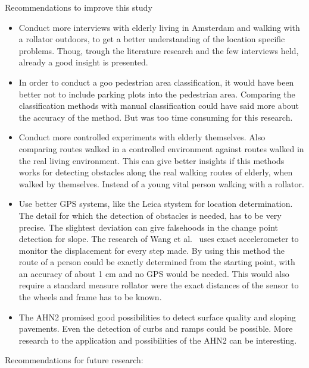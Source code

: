 Recommendations to improve this study
\begin{itemize}

\item Conduct more interviews with elderly living in Amsterdam and walking with a rollator outdoors, to get a better understanding of the location specific problems. Thoug, trough the literature research and the few interviews held, already a good insight is presented. 

\item In order to conduct a goo pedestrian area classification, it would have been better not to include parking plots into the pedestrian area. Comparing the classification methods with manual classification could have said more about the accuracy of the method. But was too time consuming for this research. 

\item Conduct more controlled experiments with elderly themselves. Also comparing routes walked in a controlled environment against routes walked in the real living environment. This can give better insights if this methods works for detecting obstacles along the real walking routes of elderly, when walked by themselves. Instead of a young vital person walking with a rollator. 

\item Use better GPS systems, like the Leica stystem for location determination. The detail for which the detection of obstacles is needed, has to be very precise. The slightest deviation can give falsehoods in the change point detection for slope. The research of Wang et al.~\cite{Wang2015} uses exact accelerometer to monitor the displacement for every step made. By using this method the route of a person could be exactly determined from the starting point, with an accuracy of about 1 cm and no GPS would be needed. This would also require a standard measure rollator were the exact distances of the sensor to the wheels and frame has to be known.

\item The AHN2 promised good possibilities to detect surface quality and sloping pavements. Even the detection of curbs and ramps could be possible. More research to the application and possibilities of the AHN2 can be interesting.
\end{itemize}
Recommendations for future research:
